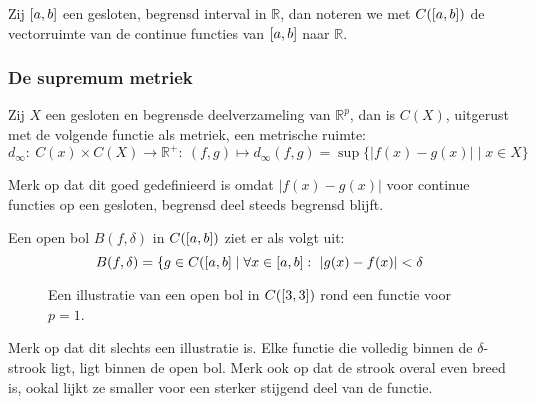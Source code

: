 \documentclass[main.tex]{subfiles}
\begin{document}
\begin{de}
  Zij $\interval{a}{b}$ een gesloten, begrensd interval in $\mathbb{R}$, dan noteren we met $C(\interval{a}{b})$ de vectorruimte van de continue functies van $\interval{a}{b}$ naar $\mathbb{R}$.
\end{de}

\subsubsection{De supremum metriek}
\label{sec:supremum-metriek}

\begin{vb}
  Zij $X$ een gesloten en begrensde deelverzameling van $\mathbb{R}^{p}$, dan is $C(X)$, uitgerust met de volgende functie als metriek, een metrische ruimte:
  \[ d_{\infty}:\ C(x)\times C(X)\rightarrow \mathbb{R}^{+}:\ (f,g) \mapsto d_{\infty}(f,g) = \sup \{ |f(x)-g(x)| \mid x \in X \} \]

\end{vb}

\begin{opm}
  Merk op dat dit goed gedefinieerd is omdat $|f(x)-g(x)|$ voor continue functies op een gesloten, begrensd deel steeds begrensd blijft. \needed
\end{opm}

\begin{vb}
  Een open bol $B(f,\delta)$ in $C(\interval{a}{b})$ ziet er als volgt uit:
  \[ B(f,\delta) = \{ g \in C(\interval{a}{b} \mid  \forall x\in \interval{a}{b}:\ |g(x)-f(x)|< \delta \]
  \begin{figure}[H]
    \centering
    \caption{ Een illustratie van een open bol in $C(\interval{3}{3})$ rond een functie voor $p=1$. }
  \end{figure}

  \noindent
  Merk op dat dit slechts een illustratie is.
  Elke functie die volledig binnen de $\delta$-strook ligt, ligt binnen de open bol.
  Merk ook op dat de strook overal even breed is, ookal lijkt ze smaller voor een sterker stijgend deel van de functie.
\end{vb}
\end{document}
